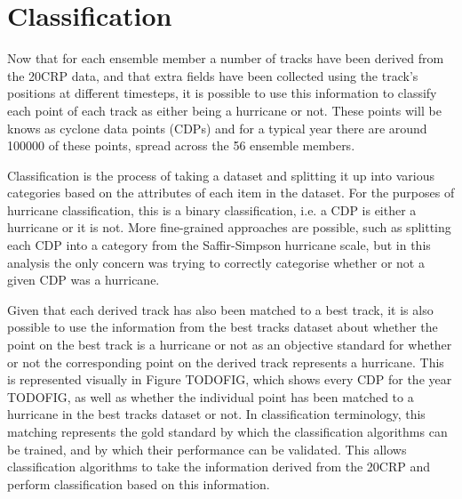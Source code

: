 \documentclass[pdftex,12pt,a4paper]{report}
\begin{document}



\section{Classification}


Now that for each ensemble member a number of tracks have been derived from the 20CRP data, and that
extra fields have been collected using the track's positions at different timesteps, it is possible
to use this information to classify each point of each track as either being a hurricane or not.
These points will be knows as cyclone data points (CDPs) and for a typical year there are around
100000 of these points, spread across the 56 ensemble members.

Classification is the process of taking a dataset and splitting it up into various categories based
on the attributes of each item in the dataset. For the purposes of hurricane classification, this is
a binary classification, i.e. a CDP is either a hurricane or it is not. More fine-grained approaches
are possible, such as splitting each CDP into a category from the Saffir-Simpson hurricane scale,
but in this analysis the only concern was trying to correctly categorise whether or not a given CDP
was a hurricane.

Given that each derived track has also been matched to a best track, it is also possible to use the
information from the best tracks dataset about whether the point on the best track is a hurricane or
not as an objective standard for whether or not the corresponding point on the derived track
represents a hurricane. This is represented visually in Figure TODOFIG, which shows every CDP for the
year TODOFIG, as well as whether the individual point has been matched to a hurricane in the best
tracks dataset or not. In classification terminology, this matching represents the gold standard by
which the classification algorithms can be trained, and by which their performance can be validated.
This allows classification algorithms to take the information derived from the 20CRP and perform
classification based on this information.
\end{document}
